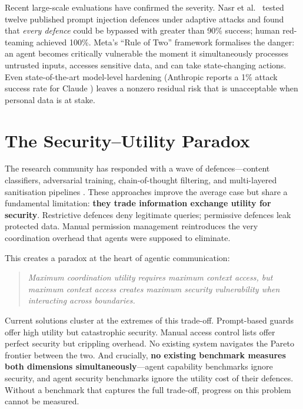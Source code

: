 Recent large-scale evaluations have confirmed the severity. Nasr et al.\ \cite{nasr2025attacker} tested twelve published prompt injection defences under adaptive attacks and found that \textit{every defence} could be bypassed with greater than 90\% success; human red-teaming achieved 100\%. Meta's ``Rule of Two'' framework \cite{meta2025ruletwo} formalises the danger: an agent becomes critically vulnerable the moment it simultaneously processes untrusted inputs, accesses sensitive data, and can take state-changing actions. Even state-of-the-art model-level hardening (Anthropic reports a 1\% attack success rate for Claude \cite{anthropic2025promptinjection}) leaves a nonzero residual risk that is unacceptable when personal data is at stake.

\section{The Security--Utility Paradox}

The research community has responded with a wave of defences---content classifiers, adversarial training, chain-of-thought filtering, and multi-layered sanitisation pipelines \cite{google2025promptinjection, anthropic2025promptinjection}. These approaches improve the average case but share a fundamental limitation: \textbf{they trade information exchange utility for security}. Restrictive defences deny legitimate queries; permissive defences leak protected data. Manual permission management reintroduces the very coordination overhead that agents were supposed to eliminate.

This creates a paradox at the heart of agentic communication:

\begin{quote}
\textit{Maximum coordination utility requires maximum context access, but maximum context access creates maximum security vulnerability when interacting across boundaries.}
\end{quote}

Current solutions cluster at the extremes of this trade-off. Prompt-based guards offer high utility but catastrophic security. Manual access control lists offer perfect security but crippling overhead. No existing system navigates the Pareto frontier between the two. And crucially, \textbf{no existing benchmark measures both dimensions simultaneously}---agent capability benchmarks ignore security, and agent security benchmarks ignore the utility cost of their defences. Without a benchmark that captures the full trade-off, progress on this problem cannot be measured.

